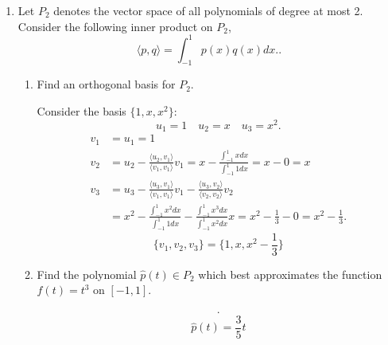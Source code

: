\documentclass{zc-ust-hw}
\begin{document}
\maketitle

\begin{enumerate}
  \item Let \( P_{2} \) denotes the vector space of all polynomials of degree at most 2.
    Consider the following inner product on \( P_{2} \), 
    \[
      \langle p,q \rangle = \int_{-1}^{1} p(x)q(x)dx.
    .\]
    \begin{enumerate}
      \item Find an orthogonal basis for \(P_{2}\). 
        \begin{sol}
          Consider the basis \(\{1, x, x^2\}\):
          \begin{equation}
            u_{1} = 1 \quad u_{2} = x \quad u_{3} = x^2
          .\end{equation}
          \begin{align}
            v_{1} &= u_{1} = 1 \\
            v_{2} &= u_{2} - \frac{\langle u_{2}, v_{1} \rangle}{\langle v_{1}, v_{1} \rangle}v_{1} = x - \frac{\int_{-1}^{1} xdx}{\int_{-1}^{1} 1dx} = x-0 = x \\
            v_{3} &= u_{3} - \frac{\langle u_{3}, v_{1} \rangle}{\langle v_{1}, v_{1} \rangle}v_{1} - \frac{\langle u_{3}, v_{2} \rangle}{\langle v_{2}, v_{2} \rangle}v_{2} \\
                  &= x^2 - \frac{\int_{-1}^{1} x^2dx}{\int_{-1}^{1} 1dx} - \frac{\int_{-1}^{1} x^3dx}{\int_{-1}^{1} x^2dx}x = x^2 - \frac{1}{3} - 0 = x^2 - \frac{1}{3}
          .\end{align}
          \begin{equation}
            \{v_{1}, v_{2}, v_{3}\} = \{1, x, x^2 - \frac{1}{3}\}
          \end{equation}
        \end{sol}
      \item Find the polynomial \( \hat{p}(t) \in P_{2} \) which best approximates the function
        \( f(t)=t^3 \) on $[ -1, 1 ]$. 
        \begin{sol}
          \begin{align}
          .\end{align}
          \begin{equation}
            \hat{p}(t) = \frac{3}{5}t
          \end{equation}
        \end{sol}
    \end{enumerate}


\end{enumerate}
\end{document}
